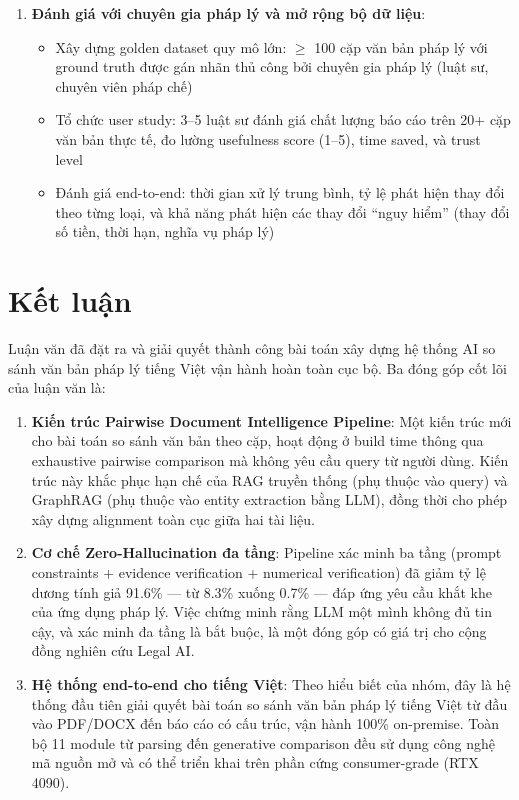 \begin{enumerate}[label=\textbf{(\arabic*)}]
    \item \textbf{Đánh giá với chuyên gia pháp lý và mở rộng bộ dữ liệu}:
    \begin{itemize}
        \item Xây dựng golden dataset quy mô lớn: $\geq$ 100 cặp văn bản pháp lý với ground truth được gán nhãn thủ công bởi chuyên gia pháp lý (luật sư, chuyên viên pháp chế)
        \item Tổ chức user study: 3--5 luật sư đánh giá chất lượng báo cáo trên 20+ cặp văn bản thực tế, đo lường usefulness score (1--5), time saved, và trust level
        \item Đánh giá end-to-end: thời gian xử lý trung bình, tỷ lệ phát hiện thay đổi theo từng loại, và khả năng phát hiện các thay đổi ``nguy hiểm'' (thay đổi số tiền, thời hạn, nghĩa vụ pháp lý)
    \end{itemize}

\end{enumerate}

\section{Kết luận}

Luận văn đã đặt ra và giải quyết thành công bài toán xây dựng hệ thống AI so sánh văn bản pháp lý tiếng Việt vận hành hoàn toàn cục bộ. Ba đóng góp cốt lõi của luận văn là:

\begin{enumerate}[label=(\arabic*)]
    \item \textbf{Kiến trúc Pairwise Document Intelligence Pipeline}: Một kiến trúc mới cho bài toán so sánh văn bản theo cặp, hoạt động ở build time thông qua exhaustive pairwise comparison mà không yêu cầu query từ người dùng. Kiến trúc này khắc phục hạn chế của RAG truyền thống (phụ thuộc vào query) và GraphRAG (phụ thuộc vào entity extraction bằng LLM), đồng thời cho phép xây dựng alignment toàn cục giữa hai tài liệu.

    \item \textbf{Cơ chế Zero-Hallucination đa tầng}: Pipeline xác minh ba tầng (prompt constraints + evidence verification + numerical verification) đã giảm tỷ lệ dương tính giả 91.6\% — từ 8.3\% xuống 0.7\% — đáp ứng yêu cầu khắt khe của ứng dụng pháp lý. Việc chứng minh rằng LLM một mình không đủ tin cậy, và xác minh đa tầng là bắt buộc, là một đóng góp có giá trị cho cộng đồng nghiên cứu Legal AI.

    \item \textbf{Hệ thống end-to-end cho tiếng Việt}: Theo hiểu biết của nhóm, đây là hệ thống đầu tiên giải quyết bài toán so sánh văn bản pháp lý tiếng Việt từ đầu vào PDF/DOCX đến báo cáo có cấu trúc, vận hành 100\% on-premise. Toàn bộ 11 module từ parsing đến generative comparison đều sử dụng công nghệ mã nguồn mở và có thể triển khai trên phần cứng consumer-grade (RTX 4090).
\end{enumerate}

